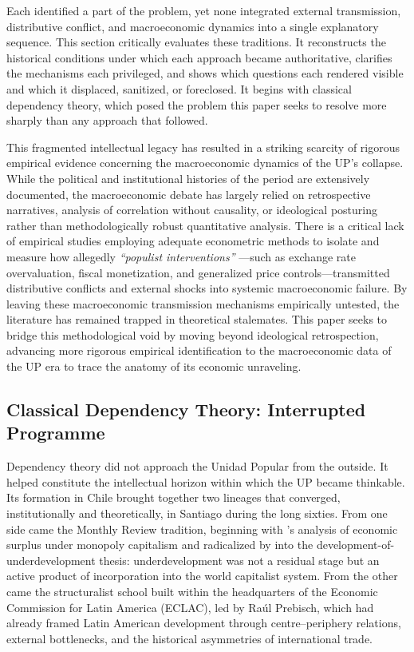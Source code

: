 Each identified a part of the problem, yet none integrated external transmission, distributive conflict, and macroeconomic dynamics into a single explanatory sequence. This section critically evaluates these traditions. It reconstructs the historical conditions under which each approach became authoritative, clarifies the mechanisms each privileged, and shows which questions each rendered visible and which it displaced, sanitized, or foreclosed. It begins with classical dependency theory, which posed the problem this paper seeks to resolve more sharply than any approach that followed. 

This fragmented intellectual legacy has resulted in a striking scarcity of rigorous empirical evidence concerning the macroeconomic dynamics of the UP's collapse. While the political and institutional histories of the period are extensively documented, the macroeconomic debate has largely relied on retrospective narratives, analysis of correlation without causality, or ideological posturing rather than methodologically robust quantitative analysis. There is a critical lack of empirical studies employing adequate econometric methods to isolate and measure how allegedly \textit{``populist interventions''} ---such as exchange rate overvaluation, fiscal monetization, and generalized price controls---transmitted distributive conflicts and external shocks into systemic macroeconomic failure. By leaving these macroeconomic transmission mechanisms empirically untested, the literature has remained trapped in theoretical stalemates. This paper seeks to bridge this methodological void by moving beyond ideological retrospection, advancing more rigorous empirical identification to the macroeconomic data of the UP era to trace the anatomy of its economic unraveling.

\subsection{Classical Dependency Theory: Interrupted Programme}
\label{sec:A1_classical_deptheory}

Dependency theory did not approach the Unidad Popular from the outside. It helped constitute the intellectual horizon within which the UP became thinkable. Its formation in Chile brought together two lineages that converged, institutionally and theoretically, in Santiago during the long sixties. From one side came the Monthly Review tradition, beginning with \citet{Baran1957}'s analysis of economic surplus under monopoly capitalism and radicalized by \citet{Frank1967} into the development-of-underdevelopment thesis: underdevelopment was not a residual stage but an active product of incorporation into the world capitalist system. From the other came the structuralist school built within the headquarters of the Economic Commission for Latin America (ECLAC), led by Raúl Prebisch, which had already framed Latin American development through centre--periphery relations, external bottlenecks, and the historical asymmetries of international trade.

